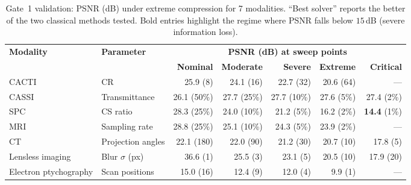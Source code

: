 \documentclass[11pt]{article}
\theoremstyle{definition}
\begin{document}
\begin{table}[htbp]
\centering
\caption{Gate~1 validation: PSNR (dB) under extreme compression for 7
modalities.  ``Best solver'' reports the better of the two classical
methods tested.  Bold entries highlight the regime where PSNR falls
below $15$\,dB (severe information loss).}
\label{tab:gate1}
\small
\begin{tabular}{l l r r r r r}
\toprule
\textbf{Modality} & \textbf{Parameter} &
  \multicolumn{5}{c}{\textbf{PSNR (dB) at sweep points}} \\
\cmidrule(lr){3-7}
 & & \textbf{Nominal} & \textbf{Moderate} & \textbf{Severe} & \textbf{Extreme} & \textbf{Critical} \\
\midrule
CACTI & CR
  & 25.9 \scriptsize{(8)} & 24.1 \scriptsize{(16)} & 22.7 \scriptsize{(32)} & 20.6 \scriptsize{(64)} & --- \\
CASSI & Transmittance
  & 26.1 \scriptsize{(50\%)} & 27.7 \scriptsize{(25\%)} & 27.7 \scriptsize{(10\%)} & 27.6 \scriptsize{(5\%)} & 27.4 \scriptsize{(2\%)} \\
SPC & CS ratio
  & 28.3 \scriptsize{(25\%)} & 24.0 \scriptsize{(10\%)} & 21.2 \scriptsize{(5\%)} & 16.2 \scriptsize{(2\%)} & \textbf{14.4} \scriptsize{(1\%)} \\
MRI & Sampling rate
  & 28.8 \scriptsize{(25\%)} & 25.1 \scriptsize{(10\%)} & 24.3 \scriptsize{(5\%)} & 23.9 \scriptsize{(2\%)} & --- \\
CT & Projection angles
  & 22.1 \scriptsize{(180)} & 22.0 \scriptsize{(90)} & 21.2 \scriptsize{(30)} & 20.7 \scriptsize{(10)} & 17.8 \scriptsize{(5)} \\
Lensless imaging & Blur $\sigma$ (px)
  & 36.6 \scriptsize{(1)} & 25.5 \scriptsize{(3)} & 23.1 \scriptsize{(5)} & 20.5 \scriptsize{(10)} & 17.9 \scriptsize{(20)} \\
Electron ptychography & Scan positions
  & 15.0 \scriptsize{(16)} & 12.4 \scriptsize{(9)} & 12.0 \scriptsize{(4)} & 9.9 \scriptsize{(1)} & --- \\
\bottomrule
\end{tabular}
\end{table}
\end{document}
